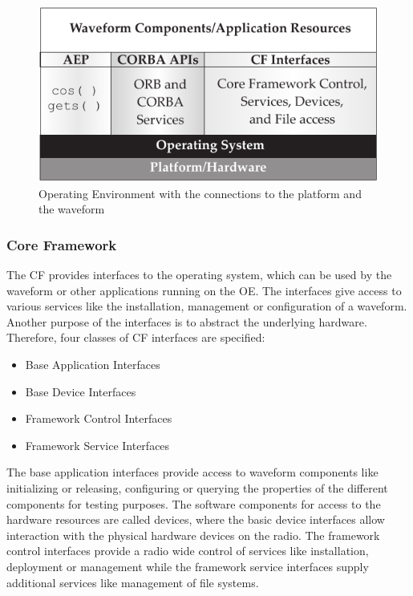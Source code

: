 \begin{figure}
	\centering
		\includegraphics[]{../kapitel02/figures/operating_environment.pdf}
	\caption{Operating Environment with the connections to the platform and the waveform}
	\label{fig:OE}
\end{figure}

\subsubsection{Core Framework}

The \ac{CF} provides interfaces to the operating system, which can be used by the waveform or other applications running on the \ac{OE}. The interfaces give access to various services like the installation, management or configuration of a waveform. Another purpose of the interfaces is to abstract the underlying hardware. Therefore, four classes of \ac{CF} interfaces are specified:

\begin{itemize}
	\item Base Application Interfaces
	\item Base Device Interfaces
	\item Framework Control Interfaces
	\item Framework Service Interfaces
\end{itemize}

The base application interfaces provide access to waveform components like initializing or releasing, configuring or querying the properties of the different components for testing purposes. The software components for access to the hardware resources are called devices, where the basic device interfaces allow interaction with the physical hardware devices on the radio. The framework control interfaces provide a radio wide control of services like installation, deployment or management while the framework service interfaces supply additional services like management of file systems.

